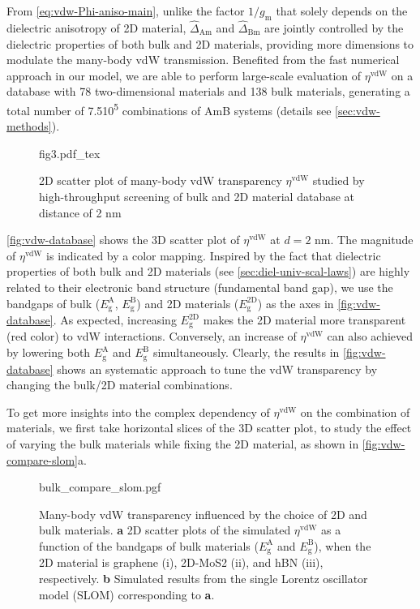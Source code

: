 From \autoref{eq:vdw-Phi-aniso-main}, unlike the factor
\(1/g_{\mathrm{m}}\) that solely depends on the dielectric
anisotropy of 2D material, \(\hat{\Delta}_{\mathrm{Am}}\) and
\(\hat{\Delta}_{\mathrm{Bm}}\) are jointly controlled by the
dielectric properties of both bulk and 2D materials, providing more
dimensions to modulate the many-body vdW transmission.
%
Benefited from
the fast numerical approach in our model, we are able to perform
large-scale evaluation of $\eta^{\mathrm{vdW}}$ on a database with
78 two-dimensional materials and 138 bulk materials, generating a total number of
7.5\texttimes{}10\textsuperscript{5} combinations of AmB systems
(details see \autoref{sec:vdw-methods}).
%
\begin{figure}[!htbp]
  \centering{}
  {fig3.pdf_tex}
  \caption{\label{fig:vdw-database} %
    2D scatter plot of many-body vdW transparency
    $\eta^{\mathrm{vdW}}$ studied by high-throughput screening of bulk
    and 2D material database at distance of 2 nm}
\end{figure}

\autoref{fig:vdw-database} shows the 3D scatter plot of
\(\eta^{\mathrm{vdW}}\) at \(d=2\) nm. The magnitude of
$\eta^{\mathrm{vdW}}$ is indicated by a color mapping.
%
Inspired by the fact that dielectric properties of both bulk
\cite{Moss_1950} and 2D materials (see
\autoref{sec:diel-univ-scal-laws}) are highly related to their
electronic band structure (\ie fundamental band gap), we use the
bandgaps of bulk (\(E_{\mathrm{g}}^{\mathrm{A}}\),
\(E_{\mathrm{g}}^{\mathrm{B}}\)) and 2D materials
(\(E_{\mathrm{g}}^{\mathrm{2D}}\)) as the axes in
\autoref{fig:vdw-database}.
%
As expected, increasing \(E_{\mathrm{g}}^{\mathrm{2D}}\) makes the 2D
material more transparent (red color) to vdW interactions.
%
Conversely, an increase of \(\eta^{\mathrm{vdW}}\) can also achieved
by lowering both \(E_{\mathrm{g}}^{\mathrm{A}}\) and
\(E_{\mathrm{g}}^{\mathrm{B}}\) simultaneously.
%
Clearly, the results in \autoref{fig:vdw-database} shows an systematic
approach to tune the vdW transparency by changing the bulk/2D material
combinations.


To get more insights into the complex dependency of
\(\eta^{\mathrm{vdW}}\) on the combination of materials, we first take
horizontal slices of the 3D scatter plot, to study the effect of
varying the bulk materials while fixing the 2D material, as shown in
\autoref{fig:vdw-compare-slom}a.
%
\begin{figure}[h!]
  \centering{}
  {bulk_compare_slom.pgf}
  \caption{\label{fig:vdw-compare-slom}%
    Many-body vdW transparency influenced by the choice of 2D and bulk
    materials. \textbf{a} 2D scatter plots of the simulated
    $\eta^{\mathrm{vdW}}$ as a function of the bandgaps of bulk
    materials ($E_{\mathrm{g}}^{\mathrm{A}}$ and
    $E_{\mathrm{g}}^{\mathrm{B}}$), when the 2D material is graphene
    (i), 2D-MoS2 (ii), and hBN (iii), respectively.  \textbf{b}
    Simulated results from the single Lorentz oscillator model (SLOM)
    corresponding to \textbf{a}.}
\end{figure}
%

